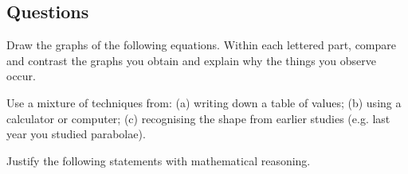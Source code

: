 \subsection*{Questions}
\begin{questions}
  \question Draw the graphs of the following equations. Within each lettered part, compare and contrast the graphs you obtain and explain why the things you observe occur.

            Use a mixture of techniques from: (a) writing down a table of values; (b) using a calculator or computer; (c) recognising the shape from earlier studies (e.g. last year
            you studied parabolae).
  \question Justify the following statements with mathematical reasoning.
    \begin{parts}

\end{parts}
\end{questions}
